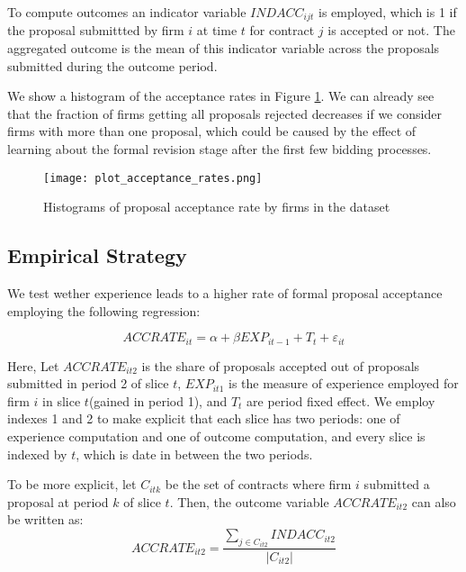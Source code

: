 To compute outcomes an indicator variable $INDACC_{ijt}$ is employed, which is 1 if the proposal submittted by firm $i$ at time $t$ for contract $j$ is accepted or not. The aggregated outcome is the mean of this indicator variable across the proposals submitted during the outcome period.

We show a histogram of the acceptance rates in Figure \ref{fig:plot_acceptance_rates}. We can already see that the fraction of firms getting all proposals rejected decreases if we consider firms with more than one proposal, which could be caused by the effect of learning about the formal revision stage after the first few bidding processes.

\begin{figure}
  \texttt{[image: plot\_acceptance\_rates.png]}
  \caption{Histograms of proposal acceptance rate by firms in the dataset}
  \label{fig:plot_acceptance_rates}
\end{figure}

\subsection{Empirical Strategy}
We test wether experience leads to a higher rate of formal proposal acceptance employing the following regression:

\begin{equation}
\label{eqn:olsspec}
ACCRATE_{it}=\alpha+ \beta EXP_{it-1}+T_t+\varepsilon_{it}
\end{equation}

Here, Let $ACCRATE_{it2}$ is the share of proposals accepted out of proposals submitted in period 2 of slice $t$, $EXP_{it1} $ is the measure of experience employed for firm $i$ in slice $t$(gained in period 1), and $T_t$ are period fixed effect. We employ indexes 1 and 2 to make explicit that each slice has two periods: one of experience computation and one of outcome computation, and every slice is indexed by $t$, which is date in between the two periods.

To be more explicit, let $C_{itk}$ be the set of contracts where firm $i$ submitted a proposal at period $k$ of slice $t$. Then, the outcome variable $ACCRATE_{it2}$ can also be written as:
$$  ACCRATE_{it2}=\dfrac{\sum_{j\in C_{it2}}INDACC_{it2}}{|C_{it2}|}$$


